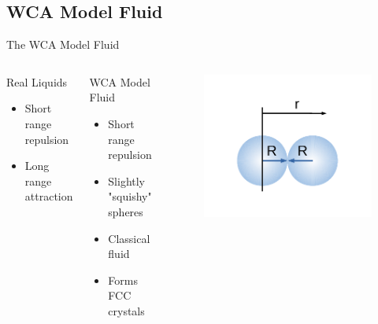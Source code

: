 \documentclass{beamer}
\begin{document}
\subsection*{WCA Model Fluid}
\begin{frame}{The WCA Model Fluid}
	\begin{columns}[t]
		\begin{block}{Real Liquids}
			\begin{itemize}
				\item Short range repulsion 
				\item Long range attraction 
			\end{itemize}
		\end{block}
		\begin{block}{WCA Model Fluid}
			\begin{itemize}
				\item Short range repulsion
				\item Slightly "squishy" spheres
				\item Classical fluid
				\item Forms FCC crystals				
			\end{itemize}
		\end{block}		
		\vspace{-3em}
          \begin{figure}
             \centering
             \includegraphics[width=1.1\columnwidth]{figs/TwoSpheresandplot.pdf} 
          \end{figure} 	 
	\end{columns}	
\end{frame}
\end{document}
